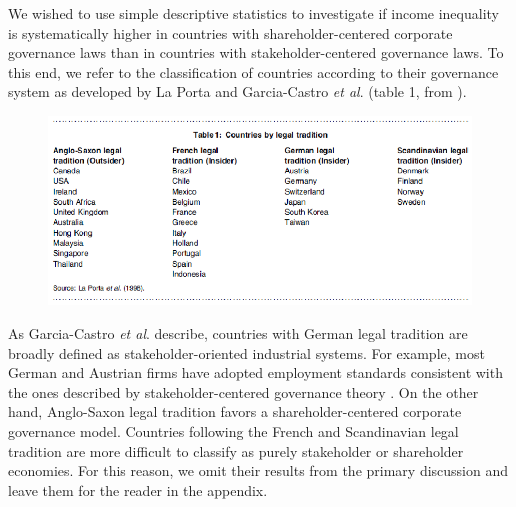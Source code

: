 \documentclass[12pt]{article}
\begin{document}
We wished to use simple descriptive statistics to investigate if income inequality is systematically higher in countries with shareholder-centered corporate governance laws than in countries with stakeholder-centered governance laws. To this end, we refer to the classification of countries according to their governance system as developed by La Porta and Garcia-Castro \textit{et al}. (table 1, from \cite[Garcia-Castro \textit{et al}. 268]{GarciaCastro}). 
\begin{figure}[!htbp]
\begin{center}
\includegraphics[width=1\textwidth]
{table.png}
\captionsetup{justification=centering}
\end{center}
\end{figure}

As Garcia-Castro \textit{et al}. describe, countries with German legal tradition are broadly defined as stakeholder-oriented industrial systems. For example, most German and Austrian firms have adopted employment standards consistent with the ones described by stakeholder-centered governance theory \cite[Garcia-Castro \textit{et al}. 268]{GarciaCastro}. On the other hand, Anglo-Saxon legal tradition favors a shareholder-centered corporate governance model. Countries following the French and Scandinavian legal tradition are more difficult to classify as purely stakeholder or shareholder economies. For this reason, we omit their results from the primary discussion and leave them for the reader in the appendix. 
\end{document}
